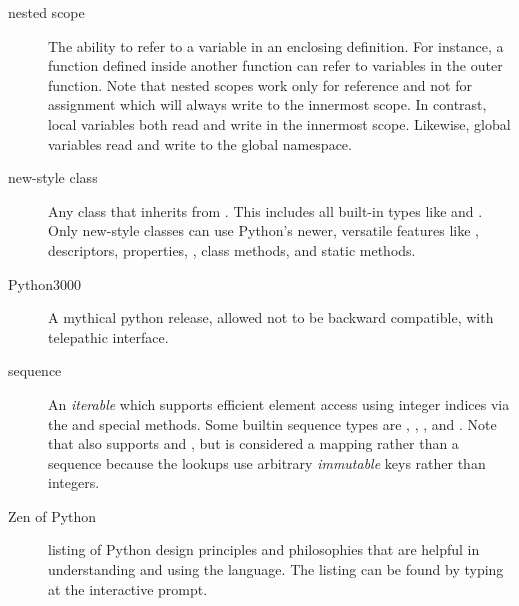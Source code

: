 \begin{description}
\item[nested scope]{The ability to refer to a variable in an enclosing
definition.  For instance, a function defined inside another function can
refer to variables in the outer function.  Note that nested scopes work only
for reference and not for assignment which will always write to the
innermost scope.  In contrast, local variables both read and write in the
innermost scope.  Likewise, global variables read and write to the global
namespace.}

\item[new-style class]{Any class that inherits from .  This
includes all built-in types like  and .  Only
new-style classes can use Python's newer, versatile features like
{}, descriptors, properties, , class
methods, and static methods.}

\item[Python3000]{A mythical python release, allowed not to be backward
compatible, with telepathic interface.}

\item[sequence]{An \emph{iterable} which supports efficient element access using
integer indices via the  and 
special methods.  Some builtin sequence types are , ,
{}, and .  Note that  also supports
{} and , but is considered a mapping
rather than a sequence because the lookups use arbitrary \emph{immutable} keys
rather than integers.}

\item[Zen of Python]{listing of Python design principles and philosophies
that are helpful in understanding and using the language.  The listing can
be found by typing  at the interactive prompt.}

\end{description}
